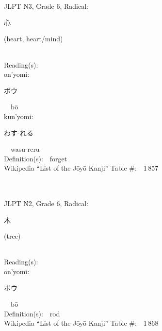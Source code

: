 \begin{multicols}{2}
\ \ \\
{\fontsize{34pt}{40pt}  }\ \ \\  %
{JLPT N3, Grade 6, Radical:\ \ {\begin{CJK}{UTF8}{min} 心 \end{CJK}} (heart, heart/mind) } \\
Reading(s):\ \ \\
{\hspace*{1em}}on'yomi:\ \ \\
{\hspace*{2em}}{\begin{CJK}{UTF8}{min} ボウ \end{CJK}}\ \ b\=o\ \ \\
{\hspace*{1em}}kun'yomi:\ \ \\
{\hspace*{2em}}{\begin{CJK}{UTF8}{min} わす-れる \end{CJK}}\ \ wasu-reru\ \ \\
Definition(s):\ \ forget \\
Wikipedia ``List of the J\=oy\=o Kanji'' Table \#:\ \ 1\,857 \\
\ \ \\
{\fontsize{34pt}{40pt}  }\ \ \\  %
{JLPT N2, Grade 6, Radical:\ \ {\begin{CJK}{UTF8}{min} 木 \end{CJK}} (tree) } \\
Reading(s):\ \ \\
{\hspace*{1em}}on'yomi:\ \ \\
{\hspace*{2em}}{\begin{CJK}{UTF8}{min} ボウ \end{CJK}}\ \ b\=o\ \ \\
Definition(s):\ \ rod \\
Wikipedia ``List of the J\=oy\=o Kanji'' Table \#:\ \ 1\,868 \\
\ \ \\
{\fontsize{34pt}{40pt}  }\ \ \\  %

\end{multicols}
